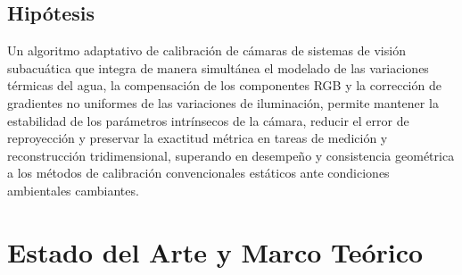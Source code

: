 \documentclass[12pt,letterpaper,spanish,twoside,openright]{report}
\begin{document}
\section{Hipótesis}

Un algoritmo adaptativo de calibración de cámaras de sistemas de visión subacuática que integra de manera simultánea el modelado de las variaciones térmicas del agua, la compensación de los componentes RGB y la corrección de gradientes no uniformes de las variaciones  de iluminación, permite mantener la estabilidad de los parámetros intrínsecos de la cámara, reducir el error de reproyección y preservar la exactitud métrica en tareas de medición y reconstrucción tridimensional, superando en desempeño y consistencia geométrica a los métodos de calibración convencionales estáticos ante condiciones ambientales cambiantes.



\chapter{Estado del Arte y Marco Teórico}
\end{document}
